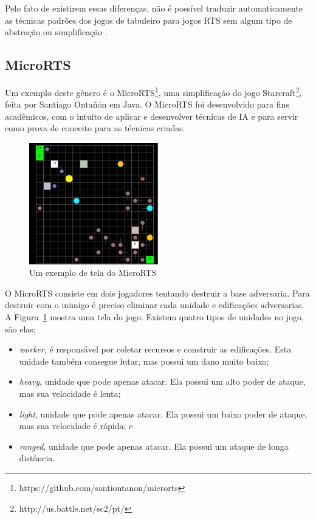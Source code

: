  
 Pelo fato de existirem essas diferenças, não é possível traduzir automaticamente as técnicas padrões dos jogos de tabuleiro para jogos RTS sem algum tipo de abstração ou simplificação \cite{ontanon2013survey}.
 
\subsection{MicroRTS}  
 
 Um exemplo deste gênero é o MicroRTS\footnote{https://github.com/santiontanon/microrts}, uma simplificação do jogo Starcraft\footnote{http://us.battle.net/sc2/pt/}, feita por Santiago Ontañón \cite{ontanon2013combinatorial} em Java. O MicroRTS foi desenvolvido para fins acadêmicos, com o intuito de aplicar e desenvolver técnicas de IA e para servir como prova de conceito para as técnicas criadas.
 
 \begin{figure}[ht]
 	\centering
 	\includegraphics[width=0.5\textwidth]{fig/microrts.pdf}
 	\caption{Um exemplo de tela do MicroRTS}
 	\label{fig:microrts}
 \end{figure} 
 
O MicroRTS consiste em dois jogadores tentando destruir a base adversaria. Para destruir com o inimigo é preciso eliminar cada unidade e edificações adversarias. A Figura~\ref{fig:microrts} mostra uma tela do jogo. Existem quatro tipos de unidades no jogo, são elas:
  
\begin{itemize}
 	\item \textit{worker}, é responsável por coletar recursos e construir as edificações. Esta unidade também consegue lutar, mas possui um dano muito baixo;
 	\item \textit{heavy}, unidade que pode apenas atacar. Ela possui um alto poder de ataque, mas sua velocidade é lenta;
 	\item \textit{light}, unidade que pode apenas atacar. Ela possui um baixo poder de ataque, mas sua velocidade é rápida; e
 	\item \textit{ranged}, unidade que pode apenas atacar. Ela possui um ataque de longa distância. 
\end{itemize} 
 
